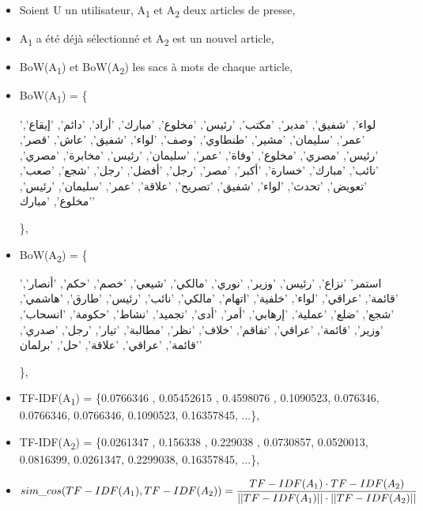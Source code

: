     \begin{itemize}[label={}, leftmargin=0cm]
        \item Soient U un utilisateur, A\textsubscript{1} et A\textsubscript{2} deux articles de presse,
        \item A\textsubscript{1} a été déjà sélectionné et A\textsubscript{2} est un nouvel article,
        \item BoW(A\textsubscript{1}) et BoW(A\textsubscript{2}) les sacs à mots de chaque article,\\

        \item BoW(A\textsubscript{1}) = \{\begin{arab}'لواء', 'شفيق', 'مدير', 'مكتب', 'رئيس', 'مخلوع', 'مبارك', 'أراد', 'دائم', 'إيقاع', 'عمر', 'سليمان', 'مشير', 'طنطاوي', 'وصف', 'لواء', 'شفيق', 'عاش', 'قصر', 'رئيس', 'مصري', 'مخلوع', 'وفاة', 'عمر', 'سليمان', 'رئيس', 'مخابرة', 'مصري', 'نائب', 'مبارك', 'خسارة', 'أكبر', 'مصر', 'رجل', 'أفضل', 'رجل', 'شجع', 'صعب', 'تعويض', 'تحدث', 'لواء', 'شفيق', 'تصريح', 'علاقة', 'عمر', 'سليمان', 'رئيس', 'مخلوع', 'مبارك'\end{arab}\},

        \item BoW(A\textsubscript{2}) = \{\begin{arab}'استمر' 'نزاع', 'رئيس', 'وزير', 'نوري', 'مالكي', 'شيعي', 'خصم', 'حكم', 'أنصار', 'قائمة', 'عراقي', 'لواء', 'خلفية', 'اتهام', 'مالكي', 'نائب', 'رئيس', 'طارق', 'هاشمي', 'شجع', 'ضلع', 'عملية', 'إرهابي', 'أمر', 'أدى', 'تجميد', 'نشاط', 'حكومة', 'انسحاب', 'وزير', 'قائمة', 'عراقي', 'تفاقم', 'خلاف', 'نظر', 'مطالبة', 'تيار', 'رجل', 'صدري', 'قائمة', 'عراقي', 'علاقة', 'حل', 'برلمان'\end{arab}\},


        \item TF-IDF(A\textsubscript{1}) = \{0.0766346 , 0.05452615 , 0.4598076 , 0.1090523,  0.076346, 0.0766346, 0.0766346, 0.1090523, 0.16357845, ...\},

        \item TF-IDF(A\textsubscript{2}) = \{0.0261347 , 0.156338 , 0.229038 , 0.0730857,  0.0520013, 0.0816399, 0.0261347, 0.2299038, 0.16357845, ...\},

        \item \[sim\_cos(TF-IDF(A\textsubscript{1}), TF-IDF(A\textsubscript{2})) = \frac {TF-IDF(A\textsubscript{1}) \cdot TF-IDF(A\textsubscript{2})}{||TF-IDF(A\textsubscript{1})|| \cdot ||TF-IDF(A\textsubscript{2})||}\]
    \end{itemize}
